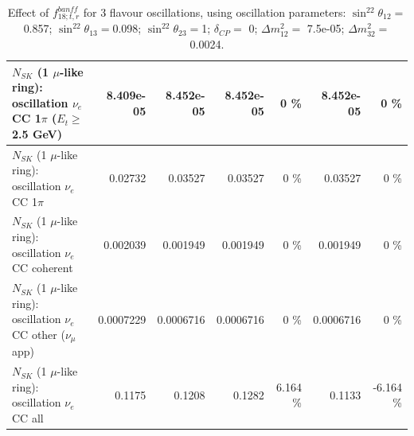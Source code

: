 \begin{table}
\begin{tabular}{| l | r | r | r  r | r  r |}
$N_{SK}$ (1 $\mu$-like ring): oscillation $\nu_e$ CC 1$\pi$ ($E_{t} \geq$ 2.5 GeV) &       8.409e-05 &       8.452e-05 &       8.452e-05 &        0 \%  &       8.452e-05 &        0 \%  \\ 
\hline
                     $N_{SK}$ (1 $\mu$-like ring): oscillation $\nu_e$ CC 1$\pi$ &         0.02732 &         0.03527 &         0.03527 &        0 \%  &         0.03527 &        0 \%  \\ 
                   $N_{SK}$ (1 $\mu$-like ring): oscillation $\nu_e$ CC coherent &        0.002039 &        0.001949 &        0.001949 &        0 \%  &        0.001949 &        0 \%  \\ 
      $N_{SK}$ (1 $\mu$-like ring): oscillation $\nu_e$ CC other ($\nu_\mu$ app) &       0.0007229 &       0.0006716 &       0.0006716 &        0 \%  &       0.0006716 &        0 \%  \\ 
                       $N_{SK}$ (1 $\mu$-like ring): oscillation $\nu_e$  CC all &          0.1175 &          0.1208 &          0.1282 &    6.164 \%  &          0.1133 &   -6.164 \%  \\ 
\hline
\hline
\end{tabular}
\caption{ Effect of $f_{18; t, r}^{banff}$ for 3 flavour oscillations, using oscillation parameters:  $\sin^22\theta_{12} = $0.857; $\sin^22\theta_{13} = $0.098; $\sin^22\theta_{23} = $1; $\delta_{CP} = $        0; $\Delta m^2_{12} = $    7.5e-05; $\Delta m^2_{32} = $    0.0024. }
\label{tab:num_banff_ccqeE0_1RmuT_3f_osc_t13:0.098}
\end{table}
\clearpage
